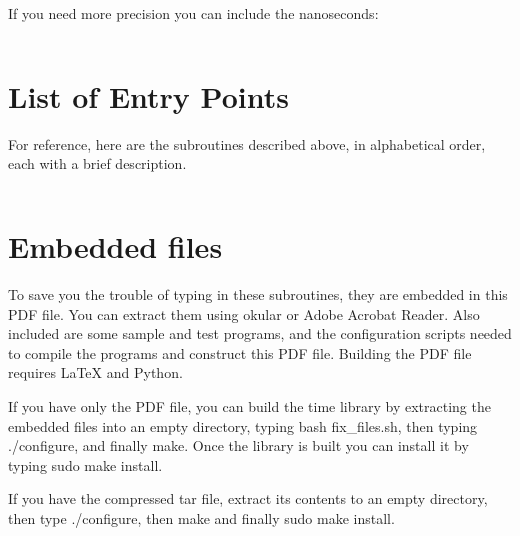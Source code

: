 \documentclass[letterpaper,twoside]{article}
\begin{document}
If you need more precision you can include the nanoseconds:
\inputminted[firstline=34]{c}{time_tm_nano_to_string.c}

\section{List of Entry Points}
For reference, here are the subroutines described above, in
alphabetical order, each with a brief description.
\inputminted[firstline=36,lastline=256]{c}{time_subroutines.h}

\section{Embedded files}
\label{section:Embedded_files}
To save you the trouble of typing in these subroutines, they are embedded
in this PDF file.  You can extract them using okular or Adobe Acrobat Reader.
Also included are some sample and test programs, and the configuration
scripts needed to compile the programs and construct this PDF file.
Building the PDF file requires {\LaTeX} and Python.

If you have only the PDF file, you can build the time library by
extracting the embedded files into an empty directory,
typing {\ttfamily bash fix\_files.sh}, 
then typing {\ttfamily ./configure},
and finally {\ttfamily make}.
Once the library is built you can install it by typing
{\ttfamily sudo make install}.

If you have the compressed tar file, extract its contents to an empty
directory, then type {\ttfamily ./configure},
then {\ttfamily make} and finally {\ttfamily sudo make install}.
\end{document}
